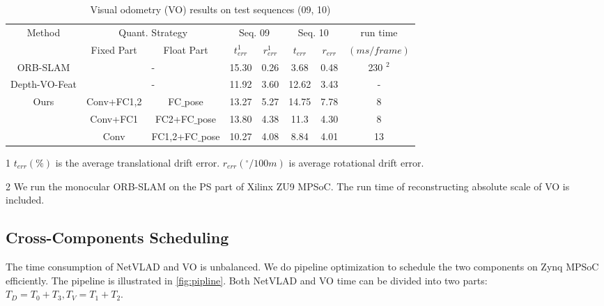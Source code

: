 \begin{table}[thb]
  \centering
  \caption{Visual odometry (VO) results on test sequences (09, 10)}
  \footnotesize
  \begin{threeparttable}
\begin{tabular}{|c||cc|cc|cc|c|}
\hline
\multirow{2}[2]{*}{Method} & \multicolumn{2}{c|}{Quant. Strategy} & \multicolumn{2}{c|}{Seq. 09} & \multicolumn{2}{c|}{Seq. 10} & run time  \bigstrut[t]\\
                           & Fixed Part             & Float Part  & $t_{err}^1$        & $r_{err}^1$ & $t_{err}$        & $r_{err}$ & $(ms/frame)$ \bigstrut[b]\\
\hline
ORB-SLAM  & \multicolumn{2}{c|}{-} &15.30 &0.26 &3.68 &0.48 & 230 $^2$ \bigstrut\\
\hline
Depth-VO-Feat\cite{Zhan:2018e92} & \multicolumn{2}{c|}{-} &11.92 &3.60 &12.62 &3.43 & - \bigstrut\\
\hline
\multirow{3}[3]{*}{Ours} & Conv+FC1,2 & FC$\_$pose & 13.27 & 5.27 & 14.75 & 7.78 & 8 \bigstrut\\
                         & Conv+FC1 & FC2+FC$\_$pose  & 13.80 & 4.38 & 11.3 & 4.30 & 8 \bigstrut\\
                         & Conv & FC1,2+FC$\_$pose &10.27 &4.08 &8.84 &4.01 & 13 \bigstrut\\
\hline
\end{tabular}

\begin{tablenotes}
      \item[1] $t_{err}(\%)$ is the average translational drift error. $r_{err}({}^{\circ}/100m)$ is average rotational drift error.
      \item[2] We run the monocular ORB-SLAM on the PS part of Xilinx ZU9 MPSoC. The run time of reconstructing absolute scale of VO is included. 
      \end{tablenotes}
    \end{threeparttable}
  \label{tab:VO}%
\end{table}%


\subsection{Cross-Components Scheduling}

The time consumption of NetVLAD and VO is unbalanced. We do pipeline optimization to schedule the two components on Zynq MPSoC efficiently. The pipeline is illustrated in \cref{fig:pipline}. Both NetVLAD and VO time can be divided into two parts: $T_{D} = T_{0} + T_{3},T_{V} = T_{1} + T_{2} $.

